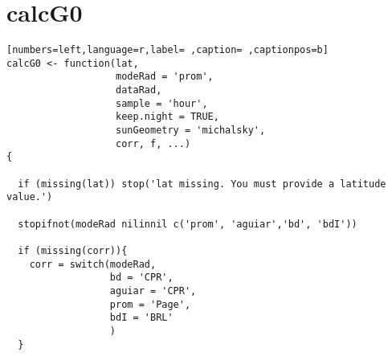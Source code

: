 \section{calcG0}
\label{sec:orgbf7287f}
\begin{lstlisting}[numbers=left,language=r,label= ,caption= ,captionpos=b]
calcG0 <- function(lat,
                   modeRad = 'prom',
                   dataRad,
                   sample = 'hour',
                   keep.night = TRUE,
                   sunGeometry = 'michalsky',
                   corr, f, ...)
{

  if (missing(lat)) stop('lat missing. You must provide a latitude value.')

  stopifnot(modeRad nilinnil c('prom', 'aguiar','bd', 'bdI'))

  if (missing(corr)){
    corr = switch(modeRad,
                  bd = 'CPR', 
                  aguiar = 'CPR', 
                  prom = 'Page',  
                  bdI = 'BRL'     
                  )
  }


\end{lstlisting}
